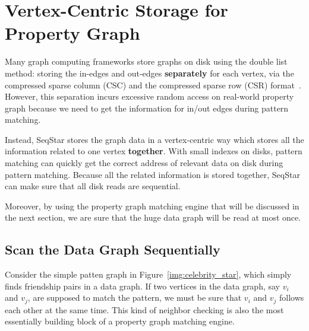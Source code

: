 \section{Vertex-Centric Storage for Property Graph}\label{sec:storage}

Many graph computing frameworks store graphs on disk using the double list method:
storing the in-edges and out-edges \textbf{separately} for each vertex,
via the compressed sparse column (CSC) and the compressed sparse row (CSR) format~\cite{DBLP:conf/sc/PearceGA10}.
However, this separation incurs excessive random access on real-world property graph because we need to get the information for in/out edges during pattern matching.

Instead, SeqStar stores the graph data in a vertex-centric way which stores all the information related to one vertex \textbf{together}. 
With small indexes on disks, pattern matching can quickly get the correct address of relevant data on disk during pattern matching. Because all the related information is stored together, SeqStar can make sure that all disk reads are sequential.

Moreover, by using the property graph matching engine that will be discussed in the next section,
we are sure that the huge data graph will be read at most once.
\subsection{Scan the Data Graph Sequentially}

Consider the simple patten graph in Figure~\ref{img:celebrity_star}, which simply finds friendship pairs in a data graph.
If two vertices in the data graph, say $v_i$ and $v_j$, are supposed to match the pattern,
we must be sure that $v_i$ and $v_j$ follows each other at the same time.
This kind of neighbor checking is also the most essentially building block of a property graph matching engine.

